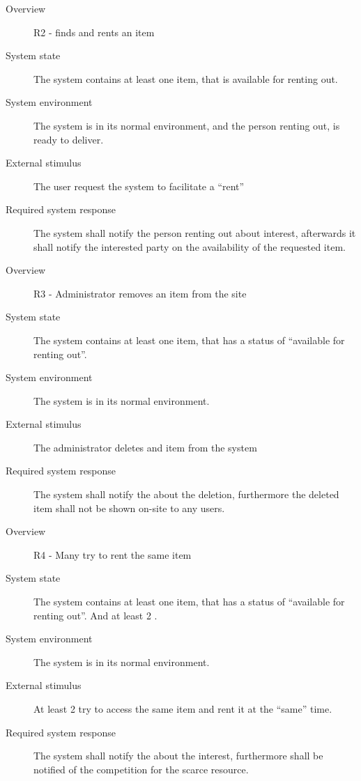 \begin{description}
    \item[Overview] R2 - \Buyer finds and rents an item
    \item[System state] The system contains at least one item, that is
        available for renting out.
    \item[System environment] The system is in its normal environment, and the
        person renting out, is ready to deliver.
    \item[External stimulus] The user request the system to facilitate a
        ``rent''
    \item[Required system response] The system shall notify the person renting
        out about interest, afterwards it shall notify the interested party on
        the availability of the requested item.
\end{description}

\begin{description}
    \item[Overview] R3 - Administrator removes an item from the site
    \item[System state] The system contains at least one item, that has a
        status of ``available for renting out''.
    \item[System environment] The system is in its normal environment.
    \item[External stimulus] The administrator deletes and item from the system 
    \item[Required system response] The system shall notify the \seller about
        the deletion, furthermore the deleted item shall not be shown on-site
        to any users.
\end{description}

\begin{description}
    \item[Overview] R4 - Many \buyers try to rent the same item
    \item[System state] The system contains at least one item, that has a
        status of ``available for renting out''. And at least 2 \buyers.
    \item[System environment] The system is in its normal environment.
    \item[External stimulus] At least 2 \buyers try to access the same item and
        rent it at the ``same'' time.
    \item[Required system response] The system shall notify the \seller about
        the interest, furthermore \buyers shall be notified of the competition
        for the scarce resource.
\end{description}

